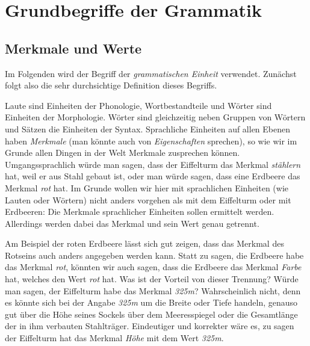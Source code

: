 \chapter{Grundbegriffe der Grammatik}

\label{sec:grundbegriffe}

\section{Merkmale und Werte}

\label{sec:merkmaleundwerte}

Im Folgenden wird der Begriff der \textit{grammatischen Einheit} verwendet.
Zunächst folgt also die sehr durchsichtige Definition dieses Begriffs.



Laute sind Einheiten der Phonologie, Wortbestandteile und Wörter sind Einheiten der Morphologie.
Wörter sind gleichzeitig neben Gruppen von Wörtern und Sätzen die Einheiten der Syntax.
Sprachliche Einheiten auf allen Ebenen haben \textit{Merkmale} (man könnte auch von \textit{Eigenschaften} sprechen), so wie wir im Grunde allen Dingen in der Welt Merkmale zusprechen können.
Umgangssprachlich würde man sagen, dass der Eiffelturm das Merkmal \textit{stählern} hat, weil er aus Stahl gebaut ist, oder man würde sagen, dass eine Erdbeere das Merkmal \textit{rot} hat.
Im Grunde wollen wir hier mit sprachlichen Einheiten (wie Lauten oder Wörtern) nicht anders vorgehen als mit dem Eiffelturm oder mit Erdbeeren:
Die Merkmale sprachlicher Einheiten sollen ermittelt werden.
Allerdings werden dabei das Merkmal und sein Wert genau getrennt.


Am Beispiel der roten Erdbeere lässt sich gut zeigen, dass das Merkmal des Rotseins auch anders angegeben werden kann.
Statt zu sagen, die Erdbeere habe das Merkmal \textit{rot}, könnten wir auch sagen, dass die Erdbeere das Merkmal \textit{Farbe} hat, welches den Wert \textit{rot} hat.
Was ist der Vorteil von dieser Trennung?
Würde man sagen, der Eiffelturm habe das Merkmal \textit{325m}?
Wahrscheinlich nicht, denn es könnte sich bei der Angabe \textit{325m} um die Breite oder Tiefe handeln, genauso gut über die Höhe seines Sockels über dem Meeresspiegel oder die Gesamtlänge der in ihm verbauten Stahlträger.
Eindeutiger und korrekter wäre es, zu sagen der Eiffelturm hat das Merkmal \textit{Höhe} mit dem Wert \textit{325m}.

